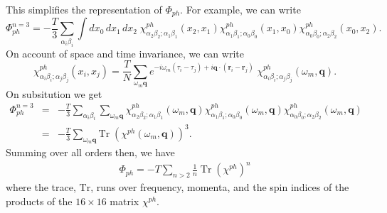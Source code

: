 This simplifies the representation of $\Phi_{ph}$.  For
example, we can write
\begin{equation}
\Phi_{ph}^{n=3} = - \frac{T}{3}
\sum_{\alpha_i \beta_i}
\int dx_0 \,dx_1 \, dx_2 \;
\chi^{ph}_{\alpha_2 \beta_2; \alpha_1 \beta_1}(x_2,x_1)
\chi^{ph}_{\alpha_1 \beta_1; \alpha_0 \beta_0}(x_1,x_0)
\chi^{ph}_{\alpha_0 \beta_0; \alpha_2 \beta_2}(x_0,x_2).
\end{equation}
On account of space and time invariance, we can write
\begin{equation}
\chi^{ph}_{\alpha_i \beta_i; \alpha_j \beta_j}(x_i, x_j) =
\frac{T}{N} \sum_{\omega_m \mathbf{q}}
e^{-i \omega_m(\tau_i - \tau_j) + 
i \mathbf{q}\cdot(\mathbf{r}_i - \mathbf{r}_j)} \;
\chi^{ph}_{\alpha_i \beta_i; \alpha_j \beta_j}(\omega_m,\mathbf{q}).
\end{equation}
On subsitution we get
\begin{eqnarray}
\Phi_{ph}^{n=3} & = & - \frac{T}{3}
\sum_{\alpha_i \beta_i}
\sum_{\omega_m \mathbf{q}}
\chi^{ph}_{\alpha_2 \beta_2; \alpha_1 \beta_1}(\omega_m, \mathbf{q})
\chi^{ph}_{\alpha_1 \beta_1; \alpha_0 \beta_0}(\omega_m, \mathbf{q})
\chi^{ph}_{\alpha_0 \beta_0; \alpha_2 \beta_2}(\omega_m, \mathbf{q})
\\
& = & - \frac{T}{3} \sum_{\omega_m \mathbf{q}} 
\mathrm{Tr} \; (\chi^{ph}(\omega_m, \mathbf{q}))^3.
\end{eqnarray}
Summing over all orders then,  we have
\begin{eqnarray}
\Phi_{ph} = -T \sum_{n > 2} \frac{1}{n}
\; \mathrm{Tr} \; (\chi^{ph})^n
\end{eqnarray}
where the trace, $\mathrm{Tr}$, runs over frequency, momenta,
and the spin indices of the products of the $16 \times 16$
matrix $\chi^{ph}$.

